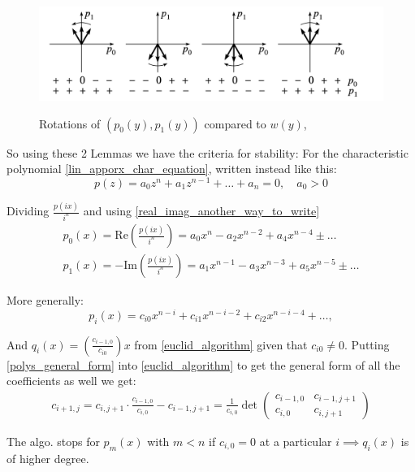 \begin{figure}[H]
\includegraphics[width=13cm]{math_pics/sageti-cumse-invart.png}
\centering
\label{fig:vector-ploly-rotations}
\caption{Rotations of $(p_0(y), p_1(y))$ compared to $w(y)$, \cite{hairer1993Nonstiff}}
\end{figure}

So using these 2 Lemmas we have the criteria for stability:
For the characteristic polynomial \ref{lin_apporx_char_equation},
written instead like this:
\[
p(z)=a_0 z^n + a_1z^{n-1} + \dots + a_n = 0, \quad a_0 > 0
\]

Dividing $\frac{p(i x)}{i^n}$ and using \ref{real_imag_another_way_to_write}
\begin{gather}
p_0(x)= \text{Re}(\frac{p(i x)}{i^n}) = a_0 x^{n} -a_2 x^{n-2} + a_4
x^{n-4} \pm \dots \\
p_1(x)= -\text{Im} (\frac{p(i x)}{i^n}) = a_1 x^{n-1} -a_3 x^{n-3} +
a_5 x^{n-5} \pm \dots
\end{gather}

More generally:
\begin{equation}\label{polys_general_form}
p_i(x) = c_{i0} x^{n-i} + c_{i1} x^{n-i-2} + c_{ i2 } x^{ n-i-4  } +
\dots, \tag{Gen. Form}
\end{equation}

And $q_i(x) = (  \frac{c_{ i-1 ,0}}{c_{ i0 }} )x$ from
\ref{euclid_algorithm} given that $c_{i0} \neq 0$.
Putting \ref{polys_general_form} into \ref{euclid_algorithm} to get
the general form of all the coefficients as well we get:
\begin{align}\label{coeff_gen_form}
c_{i+1,j} = c_{i,j+1} \cdot \frac{c_{i-1,0}}{c_{i,0}} - c_{i-1,j+1 }
= \frac{1}{c_{i,0}} \det
\begin{pmatrix}
	c_{i-1,0} & c_{i-1, j+1}            \\
	c_{i,0}   & c_{i, j+1} \tag{Coeff.}
\end{pmatrix}
\end{align}

The algo. stops for $ p_m(x) $ with $ m < n$ if $c_{i,0} = 0$ at a
particular $i \implies q_i(x)$ is of higher degree.

